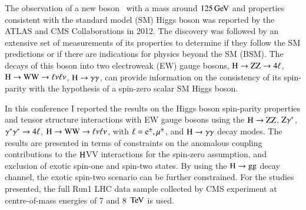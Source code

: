 The observation of a new boson~\cite{Aad:2012tfa,Chatrchyan:2012ufa}
with a mass around $125\,\mathrm{Ge\hspace{-.08em}V}$ and properties consistent with the
standard model (SM) Higgs boson was reported by the ATLAS and CMS
Collaborations in 2012. The discovery was followed by an extensive set
of measurements of its properties to determine if they follow the SM
predictions or if there are indications for physics beyond the SM
(BSM). The decays of this boson into two electroweak (EW) gauge
bosons, $\mathrm{H}\to\mathrm{Z}\mathrm{Z}\to4\ell$, $\mathrm{H}\to\mathrm{W}\mathrm{W}\to\ell\nu\ell\nu$, $\mathrm{H}\to\gamma\gamma$, can provide information on
the consistency of its spin-parity with the hypothesis of a spin-zero
scalar SM Higgs boson.

In this conference I reported the results on the Higgs boson
spin-parity properties and tensor structure interactions with EW gauge
bosons using the $\mathrm{H}\to\mathrm{Z}\mathrm{Z}$, $\mathrm{Z}\gamma^*$, $\gamma^*\gamma^*\to4\ell$,
$\mathrm{H}\to\mathrm{W}\mathrm{W}\to\ell\nu\ell\nu$, with $\ell=\mathrm{\mathrm{e}}^{\pm},\mu^{\pm}$, and $\mathrm{H}\to\gamma\gamma$ decay modes. The
results are presented in terms of constraints on the anomalous
coupling contributions to the $\mathrm{H}$VV interactions for the spin-zero
assumption, and exclusion of exotic spin-one and spin-two states.  By
using the $\mathrm{H}\to\mathrm{g}\mathrm{g}$ decay channel, the exotic spin-two scenario
can be further constrained.  For the studies presented, the full Run1
LHC data sample collected by CMS experiment at centre-of-mass energies
of 7 and 8 $\,\mathrm{Te\hspace{-.08em}V}$ is used.


